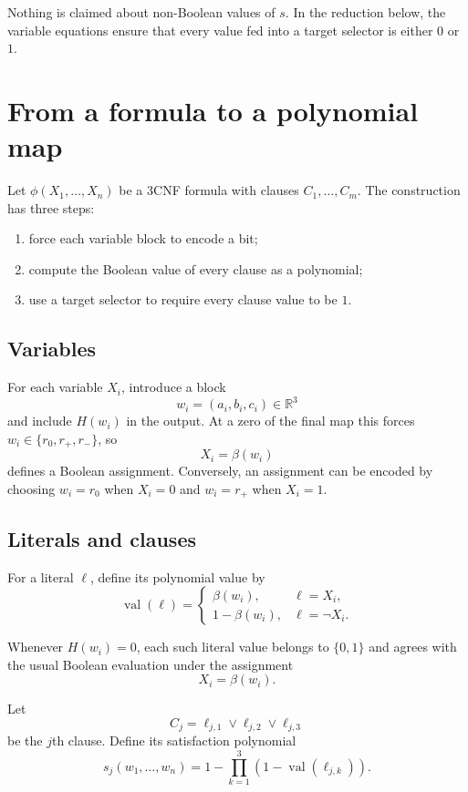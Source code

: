 \documentclass[11pt]{article}
\newcommand{\R}{\mathbb{R}}
\begin{document}
Nothing is claimed about non-Boolean values of $s$.  In the reduction below,
the variable equations ensure that every value fed into a target selector is
either $0$ or $1$.

\section{From a formula to a polynomial map}

Let $\phi(X_1,\dots,X_n)$ be a $3$CNF formula with clauses
$C_1,\dots,C_m$.  The construction has three steps:
\begin{enumerate}
\item force each variable block to encode a bit;
\item compute the Boolean value of every clause as a polynomial;
\item use a target selector to require every clause value to be $1$.
\end{enumerate}

\subsection{Variables}

For each variable $X_i$, introduce a block
\[
w_i=(a_i,b_i,c_i)\in\R^3
\]
and include $H(w_i)$ in the output.  At a zero of the final map this forces
$w_i\in\{r_0,r_+,r_-\}$, so
\[
X_i=\beta(w_i)
\]
defines a Boolean assignment.  Conversely, an assignment can be encoded by
choosing $w_i=r_0$ when $X_i=0$ and $w_i=r_+$ when $X_i=1$.

\subsection{Literals and clauses}

For a literal $\ell$, define its polynomial value by
\[
\operatorname{val}(\ell)=
\begin{cases}
\beta(w_i),
&
\ell=X_i,
\\[1mm]
1-\beta(w_i),
&
\ell=\neg X_i.
\end{cases}
\]

Whenever $H(w_i)=0$, each such literal value belongs to $\{0,1\}$ and agrees
with the usual Boolean evaluation under the assignment
\[
X_i=\beta(w_i).
\]

Let
\[
C_j=\ell_{j,1}\lor\ell_{j,2}\lor\ell_{j,3}
\]
be the $j$th clause. Define its satisfaction polynomial
\[
s_j(w_1,\dots,w_n)=1-
\prod_{k=1}^{3}
\left(
1-\operatorname{val}(\ell_{j,k})
\right).
\]
\end{document}
